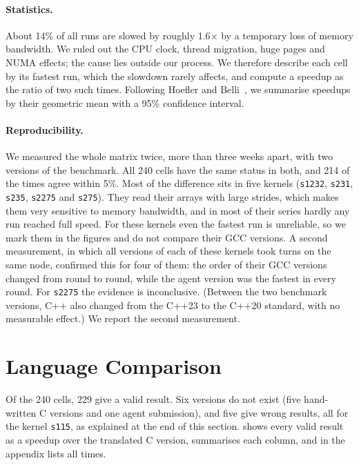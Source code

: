 \paragraph{Statistics.}
About 14\% of all runs are slowed by roughly 1.6$\times$ by a temporary loss of memory
bandwidth. We ruled out the CPU clock, thread migration, huge pages and NUMA effects; the cause
lies outside our process. We therefore describe each cell by its fastest run, which the
slowdown rarely affects, and compute a speedup as the ratio of two such times. Following Hoefler
and Belli~\cite{hoefler2015benchmarking}, we summarise speedups by their geometric mean with a
95\% confidence interval.

\paragraph{Reproducibility.}
We measured the whole matrix twice, more than three weeks apart, with two versions of the
benchmark. All 240 cells have the same status in both, and 214 of the times agree within 5\%.
Most of the difference sits in five kernels (\texttt{s1232}, \texttt{s231}, \texttt{s235},
\texttt{s2275} and \texttt{s275}). They read their arrays with large strides, which makes them
very sensitive to memory bandwidth, and in most of their series hardly any run reached full
speed. For these kernels even the fastest run is unreliable, so we mark them in the figures and
do not compare their GCC versions. A second measurement, in which all versions of each of these
kernels took turns on the same node, confirmed this for four of them: the order of their GCC
versions changed from round to round, while the agent version was the fastest in every round.
For \texttt{s2275} the evidence is inconclusive. (Between the two benchmark versions, C++ also changed from
the C++23 to the C++20 standard, with no measurable effect.) We report the second measurement.

\section{Language Comparison}
\label{sec:language-comparison}

Of the 240 cells, 229 give a valid result. Six versions do not exist (five hand-written C
versions and one agent submission), and five give wrong results, all for the kernel
\texttt{s115}, as explained at the end of this section.  shows every
valid result as a speedup over the translated C version,  summarises
each column, and  in the appendix lists all times.

